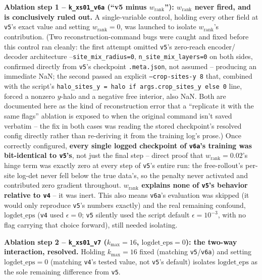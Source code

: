 \documentclass[11pt]{article}
\begin{document}
\textbf{Ablation step 1 -- \texttt{k\_xs01\_v6a} (``v5 minus
$w_{\mathrm{rank}}$''): $w_{\mathrm{rank}}$ never fired, and is
conclusively ruled out.} A single-variable control, holding every other
field at \texttt{v5}'s exact value and setting $w_{\mathrm{rank}}{=}0$,
was launched to isolate $w_{\mathrm{rank}}$'s contribution. (Two
reconstruction-command bugs were caught and fixed before this control
ran cleanly: the first attempt omitted \texttt{v5}'s zero-reach encoder/
decoder architecture --\allowbreak \texttt{site\_mix\_radius=0},
\texttt{n\_site\_mix\_layers=0} on both sides, confirmed directly from
\texttt{v5}'s checkpoint \texttt{.meta.json}, not assumed -- producing an
immediate NaN; the second passed an explicit \texttt{--crop-sites-y 8}
that, combined with the script's \texttt{halo\_sites\_y = halo if
args.crop\_sites\_y else 0} line, forced a nonzero $y$-halo and a
negative free interior, also NaN. Both are documented here as the kind
of reconstruction error that a ``replicate it with the same flags''
ablation is exposed to when the original command isn't saved verbatim --
the fix in both cases was reading the stored checkpoint's resolved
config directly rather than re-deriving it from the training log's
prose.) Once correctly configured, \textbf{every single logged
checkpoint of \texttt{v6a}'s training was bit-identical to \texttt{v5}'s},
not just the final step -- direct proof that $w_{\mathrm{rank}}{=}0.02$'s
hinge term was exactly zero at every step of \texttt{v5}'s entire run:
the free-rollout's per-site log-det never fell below the true data's, so
the penalty never activated and contributed zero gradient throughout.
\textbf{$w_{\mathrm{rank}}$ explains none of \texttt{v5}'s behavior
relative to \texttt{v4}} -- it was inert. This also means
\texttt{v6a}'s evaluation was skipped (it would only reproduce
\texttt{v5}'s numbers exactly) and the real remaining confound,
$\mathrm{logdet\_eps}$ (\texttt{v4} used $\epsilon{=}0$; \texttt{v5}
silently used the script default $\epsilon{=}10^{-3}$, with no flag
carrying that choice forward), still needed isolating.

\textbf{Ablation step 2 -- \texttt{k\_xs01\_v7} ($k_{\max}{=}16$,
$\mathrm{logdet\_eps}{=}0$): the two-way interaction, resolved.} Holding
$k_{\max}{=}16$ fixed (matching \texttt{v5}/\texttt{v6a}) and setting
$\mathrm{logdet\_eps}{=}0$ (matching \texttt{v4}'s tested value, not
\texttt{v5}'s default) isolates $\mathrm{logdet\_eps}$ as the sole
remaining difference from \texttt{v5}.
\end{document}
